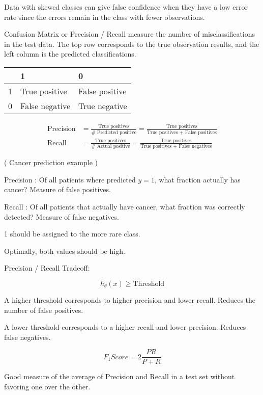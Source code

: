 \documentclass[
]{article}
\begin{document}
Data with skewed classes can give false confidence when they have a low
error rate since the errors remain in the class with fewer observations.

Confusion Matrix or Precision / Recall measure the number of
misclassifications in the test data. The top row corresponds to the true
observation results, and the left column is the predicted
classifications.

\begin{longtable}[]{@{}lll@{}}
\toprule
& 1 & 0\tabularnewline
\midrule
\endhead
1 & True positive & False positive\tabularnewline
0 & False negative & True negative\tabularnewline
\bottomrule
\end{longtable}

\begin{align}
\text{Precision} &= \frac{\text{True positives}}{ \text{# Predicted positive}} = \frac{\text{True positives}}{ \text{True positives + False positives}}\\
\text{Recall} &= \frac{\text{True positives}}{ \text{# Actual positive}} = \frac{\text{True positives}}{ \text{True positives + False negatives}}
\end{align}

( Cancer prediction example )

Precision : Of all patients where predicted \(y=1\), what fraction
actually has cancer? Measure of false positives.

Recall : Of all patients that actually have cancer, what fraction was
correctly detected? Measure of false negatives.

1 should be assigned to the more rare class.

Optimally, both values should be high.

Precision / Recall Tradeoff:

\[h_\theta(x) \ge \text{Threshold}\]

A higher threshold corresponds to higher precision and lower recall.
Reduces the number of false positives.

A lower threshold corresponds to a higher recall and lower precision.
Reduces false negatives.

\[F_1 Score = 2 \frac{PR}{P+R}\]

Good measure of the average of Precision and Recall in a test set
without favoring one over the other.
\end{document}
